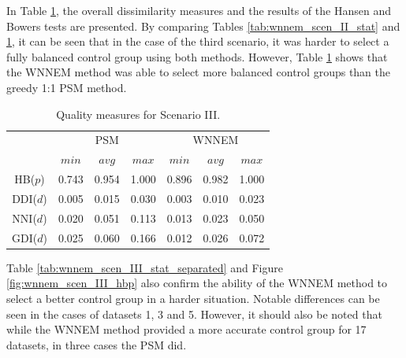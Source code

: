 		In Table \ref{tab:wnnem_scen_II2I_stat}, the overall dissimilarity measures and the results of the Hansen and Bowers tests are presented. By comparing Tables \ref{tab:wnnem_scen_II_stat} and \ref{tab:wnnem_scen_II2I_stat}, it can be seen that in the case of the third scenario, it was harder to select a fully balanced control group using both methods. However, Table \ref{tab:wnnem_scen_II2I_stat} shows that the WNNEM method was able to select more balanced control groups than the greedy 1:1 PSM method.
										
		\begin{table}[h]
			\caption{Quality measures for Scenario III.%
			}
			\label{tab:wnnem_scen_II2I_stat}
			\centering
			\begin{tabular}{ccccccc} 
				\toprule
				& \multicolumn{3}{c}{PSM} 
				& \multicolumn{3}{c}{WNNEM}\\
				         & $min$ & $avg$ & $max$ & $min$ & $avg$ & $max$ \\
				\midrule
				HB($p$)  & 0.743 & 0.954 & 1.000 & 0.896 & 0.982 & 1.000 \\
				DDI($d$) & 0.005 & 0.015 & 0.030 & 0.003 & 0.010 & 0.023 \\
				\midrule
				NNI($d$) & 0.020 & 0.051 & 0.113 & 0.013 & 0.023 & 0.050 \\
				GDI($d$) & 0.025 & 0.060 & 0.166 & 0.012 & 0.026 & 0.072 \\
				\bottomrule
			\end{tabular}
		\end{table}
										
		Table \ref{tab:wnnem_scen_III_stat_separated} and Figure \ref{fig:wnnem_scen_III_hbp} also confirm the ability of the WNNEM method to select a better control group in a harder situation. Notable differences can be seen in the cases of datasets 1, 3 and 5. However, it should also be noted that while the WNNEM method provided a more accurate control group for 17 datasets, in three cases the PSM did.
										
